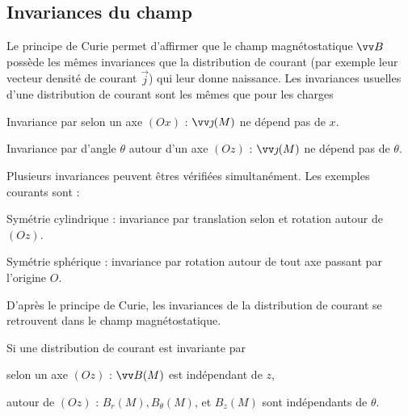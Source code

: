 \documentclass[12pt,fancy]{cours}
\begin{document}


\subsection{Invariances du champ }
Le principe de Curie permet d'affirmer que le champ magnétostatique $\B$ possède les mêmes invariances que la distribution de courant (par exemple leur vecteur densité de courant $\Vec{j}$) qui leur donne naissance. Les invariances usuelles d'une distribution de courant sont les mêmes que pour les charges
\begin{liste}
\item Invariance par  selon un axe $(Ox)$ : $\j(M)$ ne dépend pas de $x$.
\item Invariance par  d'angle $\theta$ autour d'un axe $(Oz)$ : $\j(M)$ ne dépend pas de $\theta$.
\end{liste}
Plusieurs invariances peuvent êtres vérifiées simultanément. Les exemples courants sont :
\begin{liste}
  \item Symétrie cylindrique : invariance par translation selon et rotation autour de $(Oz)$.
  \item Symétrie sphérique : invariance par rotation autour de tout axe passant par l’origine $O$.
\end{liste} 
D’après le principe de Curie, les invariances de la distribution de courant se retrouvent dans le champ magnétostatique. 
\begin{prop}\label{prop:}
  Si une distribution de courant est invariante par
    \begin{liste}
      \item
       selon un axe $(Oz)$ : $\B(M)$ est indépendant de $z$, 
      \item 
       autour de $(Oz)$ : $B_r(M), B_\theta(M)$, et $B_z(M)$ sont indépendants de $\theta$.\\
    \end{liste}
\end{prop}
\end{document}
